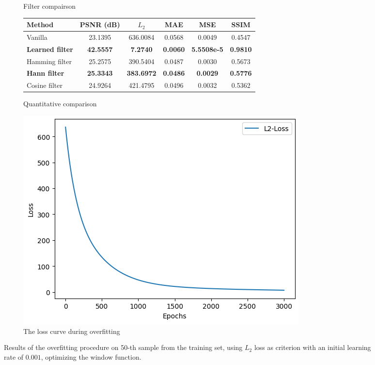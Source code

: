 \documentclass[12pt,a4paper]{article}
\begin{document}
\begin{figure}
\begin{subfigure}[t]{0.49\textwidth}
        \caption{Filter compairson}
        \label{fig:windowII+l2+slow50_filters}
    \end{subfigure}
    \hfill
    \begin{subfigure}[t]{1\textwidth}
        \centering
        \begin{tabular}{lccccc}
        \toprule
        Method & PSNR (dB) & $L_2$ & MAE & MSE & SSIM \\
        \midrule
        Vanilla & 23.1395 & 636.0084 & 0.0568 & 0.0049 & 0.4547 \\
        \textbf{Learned filter}    & \textbf{42.5557} & \textbf{7.2740} & \textbf{0.0060} & \textbf{5.5508e-5} & \textbf{0.9810} \\
        Hamming filter & 25.2575 & 390.5404 & 0.0487 & 0.0030 &  0.5673 \\
        \textbf{Hann filter} & \textbf{25.3343} & \textbf{383.6972} & \textbf{0.0486} & \textbf{0.0029} & \textbf{0.5776} \\
        Cosine filter & 24.9264 & 421.4795 & 0.0496 & 0.0032 & 0.5362 \\
        \bottomrule
        \end{tabular}
        \caption{Quantitative comparison}
        \label{fig:windowII+l2+slow50_metrics}
    \end{subfigure}
    \hfill
    \begin{subfigure}[t]{0.49\textwidth}
        \centering
        \includegraphics[width=\textwidth]{Bachelorthesis//UsedImages/l2_firstexp.png}
        \caption{The loss curve during overfitting}
         \label{fig:windowII+l2+slow50_loss}
    \end{subfigure}
    \caption{Results of the overfitting procedure on 50-th sample from the training set, using $L_2$ loss as criterion with an initial learning rate of $0.001$, optimizing the window function.}
    \label{fig:windowII+l2+slow} %
\end{figure}
\end{document}

